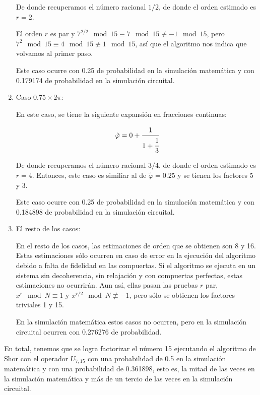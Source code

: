 \begin{enumerate}
        De donde recuperamos el número racional $1/2$, de donde el orden estimado es $r = 2$.

        El orden $r$ es par y $7^{2/2}\mod 15 \equiv 7\mod 15 \not\equiv -1\mod 15$, pero $7^2\mod 15 \equiv 4\mod 15 \not\equiv 1\mod 15$, así que el algoritmo nos indica que volvamos al primer paso.

        Este caso ocurre con 0.25 de probabilidad en la simulación matemática y con 0.179174 de probabilidad en la simulación circuital.

    \item Caso $0.75 \times 2\pi$:

        En este caso, se tiene la siguiente expansión en fracciones continuas:

        \begin{equation}
            \tilde{\varphi} = 0 + \cfrac{1}{1 + \cfrac{1}{3}}
        \end{equation}
        
        De donde recuperamos el número racional $3/4$, de donde el orden estimado es $r = 4$. Entonces, este caso es similiar al de $\tilde{\varphi} = 0.25$ y se tienen los factores 5 y 3.

        Este caso ocurre con 0.25 de probabilidad en la simulación matemática y con 0.184898 de probabilidad en la simulación circuital.

    \item El resto de los casos:

        En el resto de los casos, las estimaciones de orden que se obtienen son 8 y 16. Estas estimaciones sólo ocurren en caso de error en la ejecución del algoritmo debido a falta de fidelidad en las compuertas. Si el algoritmo se ejecuta en un sistema sin decoherencia, sin relajación y con compuertas perfectas, estas estimaciones no ocurrirán. Aun así, ellas pasan las pruebas $r$ par, $x^r \mod N \equiv 1$ y $x^{r/2} \mod N \not\equiv -1$, pero sólo se obtienen los factores triviales 1 y 15.

        En la simulación matemática estos casos no ocurren, pero en la simulación circuital ocurren con 0.276276 de probabilidad.
\end{enumerate}

En total, tenemos que se logra factorizar el número 15 ejecutando el algoritmo de Shor con el operador $U_{7,15}$ con una probabilidad de 0.5 en la simulación matemática y con una probabilidad de 0.361898, esto es, la mitad de las veces en la simulación matemática y más de un tercio de las veces en la simulación circuital.

